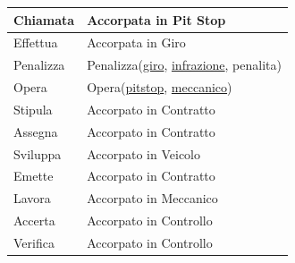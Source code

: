 \documentclass[11pt]{article}
\begin{document}
\begin{center}
{\begin{tabular}{ |l|l| }
            \hline
            Chiamata & Accorpata in Pit Stop \\
            \hline
            Effettua & Accorpata in Giro \\
            \hline
            Penalizza & Penalizza(\underline{giro}, \underline{infrazione}, penalita) \\
            \hline
            Opera & Opera(\underline{pitstop}, \underline{meccanico}) \\
            \hline
            Stipula & Accorpato in Contratto \\
            \hline
            Assegna & Accorpato in Contratto \\
            \hline
            Sviluppa & Accorpato in Veicolo \\
            \hline
            Emette & Accorpato in Contratto \\
            \hline
            Lavora & Accorpato in Meccanico \\
            \hline
            Accerta & Accorpato in Controllo \\
            \hline
            Verifica & Accorpato in Controllo \\
            \hline
        \end{tabular}
    }
\end{center}
\end{document}
